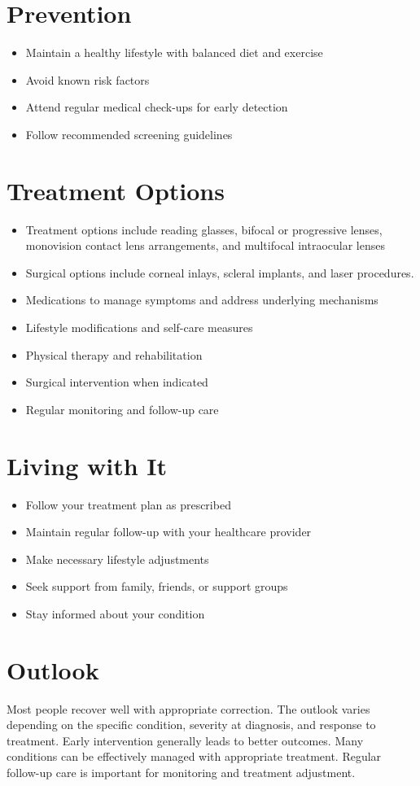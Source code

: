 \section{Prevention}
\begin{itemize}[noitemsep]
  \item Maintain a healthy lifestyle with balanced diet and exercise
  \item Avoid known risk factors
  \item Attend regular medical check-ups for early detection
  \item Follow recommended screening guidelines
\end{itemize}
\section{Treatment Options}
\begin{itemize}[noitemsep]
  \item Treatment options include reading glasses, bifocal or progressive lenses, monovision contact lens arrangements, and multifocal intraocular lenses
  \item Surgical options include corneal inlays, scleral implants, and laser procedures.
  \item Medications to manage symptoms and address underlying mechanisms
  \item Lifestyle modifications and self-care measures
  \item Physical therapy and rehabilitation
  \item Surgical intervention when indicated
  \item Regular monitoring and follow-up care
\end{itemize}
\section{Living with It}
\begin{itemize}[noitemsep]
  \item Follow your treatment plan as prescribed
  \item Maintain regular follow-up with your healthcare provider
  \item Make necessary lifestyle adjustments
  \item Seek support from family, friends, or support groups
  \item Stay informed about your condition
\end{itemize}
\section{Outlook}
Most people recover well with appropriate correction. The outlook varies depending on the specific condition, severity at diagnosis, and response to treatment. Early intervention generally leads to better outcomes. Many conditions can be effectively managed with appropriate treatment. Regular follow-up care is important for monitoring and treatment adjustment.
